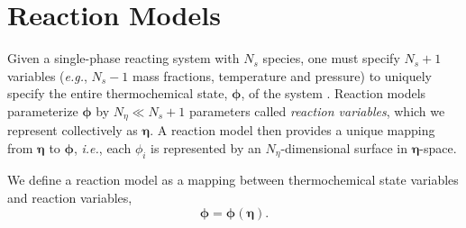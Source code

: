 \documentclass[10pt]{book}
\begin{document}
\chapter{Reaction Models}
Given a single-phase reacting system with $N_s$ species, one must
specify $N_s \! +\! 1$ variables (\emph{e.g.}, $N_s \! -\! 1$ mass
fractions, temperature and pressure) to uniquely specify the entire
thermochemical state, $\boldsymbol{\phi}$, of the system
\cite{williams85,felder86,smith01}.  Reaction models parameterize
$\boldsymbol{\phi}$ by $N_\eta \ll N_s+1$ parameters called
\emph{reaction variables}, which we represent collectively as
$\boldsymbol{\eta}$.  A reaction model then provides a unique mapping
from $\boldsymbol{\eta}$ to $\boldsymbol{\phi}$, \emph{i.e.}, each
$\phi_i$ is represented by an $N_\eta$-dimensional surface in
$\boldsymbol{\eta}$-space.

We define a reaction model as a mapping between thermochemical state
variables and reaction variables,
\begin{equation}
  \label{eqn:rxnMdlDef}
  \boldsymbol{\phi} = \boldsymbol{\phi}(\boldsymbol{\eta}).
\end{equation}

\end{document}
